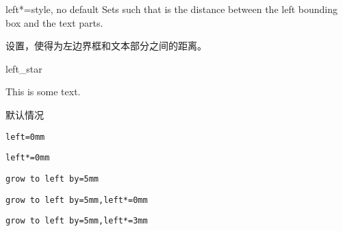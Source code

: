 \begin{docTcbKey}[][doc new=2017-02-16]{left*}{=}{style, no default}
Sets  such that  is the distance between
the left bounding box and the text parts.

设置，使得为左边界框和文本部分之间的距离。


\begin{exdispExample}{left_star}

This is some text.

\begin{tcolorbox}
默认情况
\end{tcolorbox}

\begin{tcolorbox}[left=0mm,
enhanced,show bounding box]
\verb|left=0mm|
\end{tcolorbox}

\begin{tcolorbox}[left*=0mm,
enhanced,show bounding box]
\verb|left*=0mm|
\end{tcolorbox}

\begin{tcolorbox}[grow to left by=5mm,
enhanced,show bounding box]
\verb|grow to left by=5mm|
\end{tcolorbox}

\begin{tcolorbox}[grow to left by=5mm,left*=0mm,
enhanced,show bounding box]
\verb|grow to left by=5mm,left*=0mm|
\end{tcolorbox}

\begin{tcolorbox}[grow to left by=5mm,left*=3mm,
enhanced,show bounding box]
\verb|grow to left by=5mm,left*=3mm|
\end{tcolorbox}


\end{exdispExample}
\end{docTcbKey}



